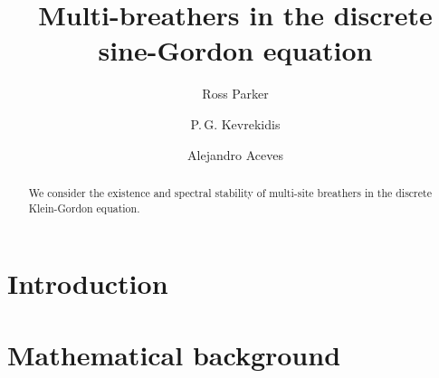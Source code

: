 \documentclass[12pt,reqno]{amsart}
\begin{document}
\title{Multi-breathers in the discrete sine-Gordon equation}

\author{Ross Parker}
\address{Department of Mathematics, Southern Methodist University, 
Dallas, TX 75275, USA}

\author{P.\,G. Kevrekidis} 
\address{Department of Mathematics and Statistics, University of Massachusetts, Amherst MA 01003, USA}

\author{Alejandro Aceves}
\address{Department of Mathematics, Southern Methodist University, 
Dallas, TX 75275, USA}

\begin{abstract}
	We consider the existence and spectral stability of multi-site breathers in the discrete Klein-Gordon equation.
\end{abstract}

\maketitle

\section{Introduction}

\section{Mathematical background}\label{sec:bg}
\end{document}
